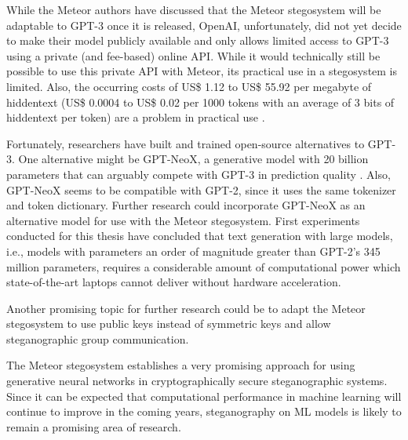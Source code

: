 While the Meteor authors have discussed that the Meteor stegosystem will be adaptable to GPT-3 once it is released, OpenAI, unfortunately, did not yet decide to make their model publicly available and only allows limited access to GPT-3 using a private (and fee-based) online API.
While it would technically still be possible to use this private API with Meteor, its practical use in a stegosystem is limited.
Also, the occurring costs of US\$ 1.12 to US\$ 55.92 per megabyte of hiddentext (US\$ 0.0004 to US\$ 0.02 per 1000 tokens with an average of 3 bits of hiddentext per token) are a problem in practical use \cite{OpenAIPricing2022}.

Fortunately, researchers have built and trained open-source alternatives to GPT-3.
One alternative might be GPT-NeoX, a generative model with 20 billion parameters that can arguably compete with GPT-3 in prediction quality \cite{GPTneo2022}.
Also, GPT-NeoX seems to be compatible with GPT-2, since it uses the same tokenizer and token dictionary.
Further research could incorporate GPT-NeoX as an alternative model for use with the Meteor stegosystem.
First experiments conducted for this thesis have concluded that text generation with large models, i.e., models with parameters an order of magnitude greater than GPT-2's 345 million parameters, requires a considerable amount of computational power which state-of-the-art laptops cannot deliver without hardware acceleration.

Another promising topic for further research could be to adapt the Meteor stegosystem to use public keys instead of symmetric keys and allow steganographic group communication.

The Meteor stegosystem establishes a very promising approach for using generative neural networks in cryptographically secure steganographic systems.
Since it can be expected that computational performance in machine learning will continue to improve in the coming years, steganography on ML models is likely to remain a promising area of research.